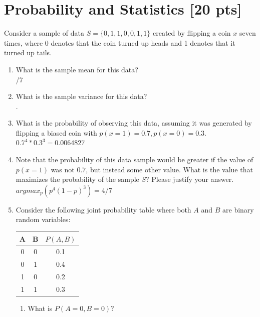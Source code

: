\documentclass[a4paper]{article}
\theoremstyle{definition}
\newenvironment{soln}{
    \leavevmode\color{blue}\ignorespaces
}{}
\begin{document}
\section{Probability and Statistics [20 pts]}
Consider a sample of data $S = \{0, 1, 1, 0, 0, 1, 1\}$ created by flipping a coin $x$ seven times, where 0 denotes that the coin turned up heads and 1 denotes that it turned up tails.
\begin{enumerate}
	\item 	What is the sample mean for this data?\\
	    \begin{soln}  4/7 \end{soln}
	\item 	What is the sample variance for this data?\\
	    \begin{soln}  0.2857143. \end{soln}
	\item 	What is the probability of observing this data, assuming it was generated by flipping a biased coin with $p(x=1) = 0.7, p(x=0) = 0.3$.\\
	    \begin{soln}  $0.7^4*0.3^3 = 0.0064827$ \end{soln}
	\item 	Note that the probability of this data sample would be greater if the value of $p(x = 1)$ was not $0.7$, but instead some other value. What is the value that maximizes the probability of the sample $S$? Please justify your answer.\\
	    \begin{soln}  $argmax_p (p^4(1-p)^3) = 4/7$ \end{soln}
	\item 	Consider the following joint probability table where both $A$ and $B$ are binary random variables: 
\begin{table}[htb]
\centering
	\begin{tabular}{ccc}\hline
	A & B & $P(A, B)$  \\\hline
	0 & 0 & 0.1 \\
	0 & 1 & 0.4 \\
	1 & 0 & 0.2 \\
	1 & 1 & 0.3 \\\hline
	\end{tabular}
\end{table}
\begin{enumerate}
	\item 	What is $P(A = 0, B = 0)$?\\

\end{enumerate}
\end{enumerate}
\end{document}
